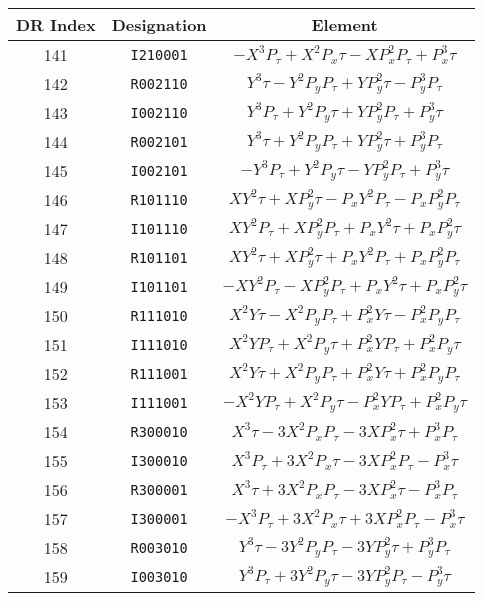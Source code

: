 {{\begin{center}
\newpage
\hspace*{-.25in}
\begin{tabular}{ccc}
DR Index&Designation&Element\\ \hline
  141&{\tt I210001}&$-X^{3}P_{\tau}+X^{2}P_x{\tau}-XP_x^{2}P_{\tau}+P_x^{3}{\tau}$\\
  142&{\tt R002110}&$Y^{3}{\tau}-Y^{2}P_yP_{\tau}+YP_y^{2}{\tau}-P_y^{3}P_{\tau}$\\
  143&{\tt I002110}&$Y^{3}P_{\tau}+Y^{2}P_y{\tau}+YP_y^{2}P_{\tau}+P_y^{3}{\tau}$\\
  144&{\tt R002101}&$Y^{3}{\tau}+Y^{2}P_yP_{\tau}+YP_y^{2}{\tau}+P_y^{3}P_{\tau}$\\
  145&{\tt I002101}&$-Y^{3}P_{\tau}+Y^{2}P_y{\tau}-YP_y^{2}P_{\tau}+P_y^{3}{\tau}$\\
  146&{\tt R101110}&$XY^{2}{\tau}+XP_y^{2}{\tau}-P_xY^{2}P_{\tau}-P_xP_y^{2}P_{\tau}$\\
  147&{\tt I101110}&$XY^{2}P_{\tau}+XP_y^{2}P_{\tau}+P_xY^{2}{\tau}+P_xP_y^{2}{\tau}$\\
  148&{\tt R101101}&$XY^{2}{\tau}+XP_y^{2}{\tau}+P_xY^{2}P_{\tau}+P_xP_y^{2}P_{\tau}$\\
  149&{\tt I101101}&$-XY^{2}P_{\tau}-XP_y^{2}P_{\tau}+P_xY^{2}{\tau}+P_xP_y^{2}{\tau}$\\
  150&{\tt R111010}&$X^{2}Y{\tau}-X^{2}P_yP_{\tau}+P_x^{2}Y{\tau}-P_x^{2}P_yP_{\tau}$\\
  151&{\tt I111010}&$X^{2}YP_{\tau}+X^{2}P_y{\tau}+P_x^{2}YP_{\tau}+P_x^{2}P_y{\tau}$\\
  152&{\tt R111001}&$X^{2}Y{\tau}+X^{2}P_yP_{\tau}+P_x^{2}Y{\tau}+P_x^{2}P_yP_{\tau}$\\
  153&{\tt I111001}&$-X^{2}YP_{\tau}+X^{2}P_y{\tau}-P_x^{2}YP_{\tau}+P_x^{2}P_y{\tau}$\\
  154&{\tt R300010}&$X^{3}{\tau}-3X^{2}P_xP_{\tau}-3XP_x^{2}{\tau}+P_x^{3}P_{\tau}$\\
  155&{\tt I300010}&$X^{3}P_{\tau}+3X^{2}P_x{\tau}-3XP_x^{2}P_{\tau}-P_x^{3}{\tau}$\\
  156&{\tt R300001}&$X^{3}{\tau}+3X^{2}P_xP_{\tau}-3XP_x^{2}{\tau}-P_x^{3}P_{\tau}$\\
  157&{\tt I300001}&$-X^{3}P_{\tau}+3X^{2}P_x{\tau}+3XP_x^{2}P_{\tau}-P_x^{3}{\tau}$\\
  158&{\tt R003010}&$Y^{3}{\tau}-3Y^{2}P_yP_{\tau}-3YP_y^{2}{\tau}+P_y^{3}P_{\tau}$\\
  159&{\tt I003010}&$Y^{3}P_{\tau}+3Y^{2}P_y{\tau}-3YP_y^{2}P_{\tau}-P_y^{3}{\tau}$\\

\end{tabular}
\end{center}}}
